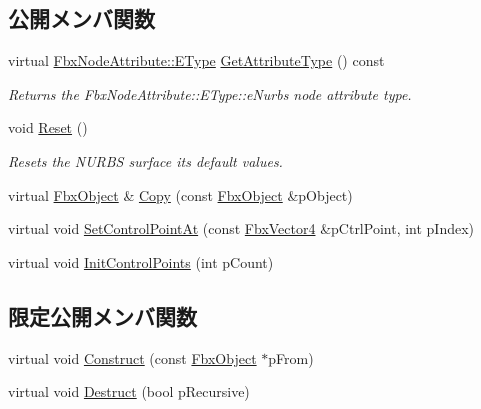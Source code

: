 \subsection*{公開メンバ関数}
\begin{DoxyCompactItemize}
\item 
virtual \hyperlink{class_fbx_node_attribute_a08e1669d3d1a696910756ab17de56d6a}{Fbx\+Node\+Attribute\+::\+E\+Type} \hyperlink{class_fbx_nurbs_a6c810e3a50538b346cbbf61338dca907}{Get\+Attribute\+Type} () const
\begin{DoxyCompactList}\small\item\em Returns the Fbx\+Node\+Attribute\+::\+E\+Type\+::e\+Nurbs node attribute type. \end{DoxyCompactList}\item 
void \hyperlink{class_fbx_nurbs_a2796c708ff8e01b1fd7d1f4d0a02cb5f}{Reset} ()
\begin{DoxyCompactList}\small\item\em Resets the N\+U\+R\+BS surface its default values. \end{DoxyCompactList}\item 
virtual \hyperlink{class_fbx_object}{Fbx\+Object} \& \hyperlink{class_fbx_nurbs_ac7c9a9018b4fdbe72b258a2fa0a3367d}{Copy} (const \hyperlink{class_fbx_object}{Fbx\+Object} \&p\+Object)
\item 
virtual void \hyperlink{class_fbx_nurbs_a46f56bfb4c6ffc90b79b2e0b81c89880}{Set\+Control\+Point\+At} (const \hyperlink{class_fbx_vector4}{Fbx\+Vector4} \&p\+Ctrl\+Point, int p\+Index)
\item 
virtual void \hyperlink{class_fbx_nurbs_aa0ff0dd79f86ab4d6976b73d003fd6be}{Init\+Control\+Points} (int p\+Count)
\end{DoxyCompactItemize}
\subsection*{限定公開メンバ関数}
\begin{DoxyCompactItemize}
\item 
virtual void \hyperlink{class_fbx_nurbs_a1d62f29d7315e343d5c0c414dab3fabb}{Construct} (const \hyperlink{class_fbx_object}{Fbx\+Object} $\ast$p\+From)
\item 
virtual void \hyperlink{class_fbx_nurbs_a8a5ea388bc948e47ab65e1705f98f402}{Destruct} (bool p\+Recursive)
\end{DoxyCompactItemize}
